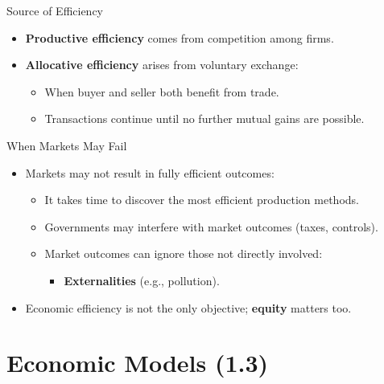 \documentclass[aspectratio=169]{beamer}
\begin{document}
\begin{frame}{Source of Efficiency}
\transfade
\begin{itemize}
  \item \textbf{Productive efficiency} comes from \alert{competition} among firms.
  \item \textbf{Allocative efficiency} arises from \alert{voluntary exchange}:
  \begin{itemize}
    \item When buyer and seller both benefit from trade.
    \item Transactions continue until no further mutual gains are possible.
  \end{itemize}
\end{itemize}
\end{frame}

\begin{frame}{When Markets May Fail}
\transfade
\begin{itemize}
  \item Markets may not result in fully efficient outcomes:
  \begin{itemize}
    \item It takes time to discover the most efficient production methods.
    \item Governments may interfere with market outcomes (taxes, controls).
    \item Market outcomes can ignore those not directly involved:
    \begin{itemize}
      \item \textbf{Externalities} (e.g., pollution).
    \end{itemize}
  \end{itemize}
  \item Economic efficiency is not the only objective; \textbf{equity} matters too.
\end{itemize}
\end{frame}

\section{Economic Models (1.3)}
\end{document}
